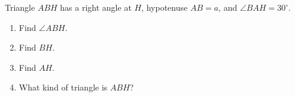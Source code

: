 Triangle $ABH$ has a right angle at $H$, hypotenuse $AB=a$, and $\angle BAH=30^\circ$.
\begin{enumerate}
\item Find $\angle ABH$. \item Find $BH$. \item Find $AH$. \item What kind of triangle is $ABH$?
\end{enumerate}
